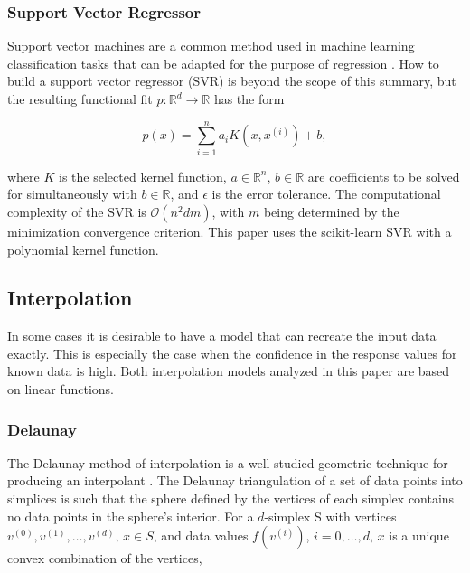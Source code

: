 \documentclass{scspaperproc}
\theoremstyle{scsthe}
\begin{document}
\subsubsection{Support Vector Regressor}
Support vector machines are a common method used in machine learning
classification tasks that can be adapted for the purpose of regression
. How to build a support vector regressor
(SVR) is beyond the scope of this summary, but the resulting
functional fit $p : \mathbb{R}^d \rightarrow \mathbb{R}$ has the form

$$ p(x)  = \sum_{i=1}^{n}a_i K(x,x^{(i)}) + b ,$$



where $K$ is the selected kernel function, $a \in \mathbb{R}^n$, $b
\in \mathbb{R}$ are coefficients to be solved for simultaneously with
$b \in \mathbb{R}$, and $\epsilon$ is the error tolerance. The
computational complexity of the SVR is $\mathcal{O}(n^2dm)$, with $m$
being determined by the minimization convergence criterion. This paper
uses the scikit-learn SVR  with a polynomial
kernel function.

\subsection{Interpolation}

In some cases it is desirable to have a model that can recreate the
input data exactly. This is especially the case when the confidence in
the response values for known data is high. Both interpolation models
analyzed in this paper are based on linear functions.

\subsubsection{Delaunay}

The Delaunay method of interpolation is a well studied geometric
technique for producing an interpolant . The
Delaunay triangulation of a set of data points into simplices is such
that the sphere defined by the vertices of each simplex contains no
data points in the sphere's interior. For a $d$-simplex S with
vertices $v^{(0)}, v^{(1)}, \ldots, v^{(d)}$, $x \in S$, and data
values $f(v^{(i)})$, $i=0,\ldots,d$, $x$ is a unique convex
combination of the vertices,
\end{document}

